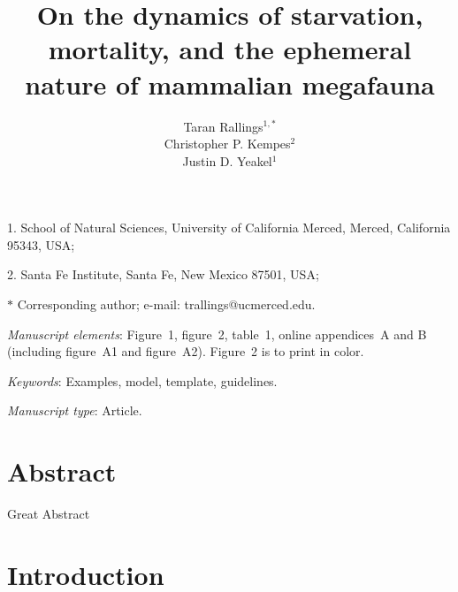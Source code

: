 \documentclass[11pt]{article}
\title{On the dynamics of starvation, mortality, and the ephemeral nature of mammalian megafauna}
\author{Taran Rallings$^{1,\ast}$ \\ 
Christopher P. Kempes$^{2}$ \\ 
Justin D. Yeakel$^{1}$}
\date{}
\begin{document}
\maketitle

\noindent{} 1. School of Natural Sciences, University of California Merced, Merced, California 95343, USA;

\noindent{} 2. Santa Fe Institute, Santa Fe, New Mexico 87501, USA;


\noindent{} $\ast$ Corresponding author; e-mail: trallings@ucmerced.edu.


\bigskip

\textit{Manuscript elements}: Figure~1, figure~2, table~1, online appendices~A and B (including figure~A1 and figure~A2). Figure~2 is to print in color.

\bigskip

\textit{Keywords}: Examples, model, template, guidelines.

\bigskip

\textit{Manuscript type}: Article. %

\bigskip



\newpage{}

\section*{Abstract}

Great Abstract

\newpage{}


\section*{Introduction}
\end{document}
